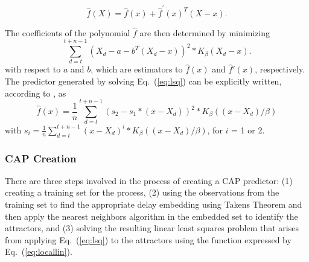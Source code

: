 \documentclass[prodmode,acmtaco,pdftex]{acmsmall}
\newcommand{\equationname}{Eq.}
\begin{document}
  \begin{equation}
    \label{eq:localtaylor}
    \hat{f}(X)=\hat{f}(x)+\hat{f}^{'}(x)^{T}(X-x).\nonumber
  \end{equation}

The coefficients of the polynomial $\hat{f}$ are then determined by minimizing
  \begin{equation}
    \label{eq:lsq}
    \displaystyle\sum_{d=t}^{t+n-1}\left(X_{d}-a-b^{T}(X_{d}-x)\right)^{2}*K_{\beta}(X_{d}-x).
  \end{equation}
 with respect to $a$ and $b$, which are estimators to
$\hat{f}(x)$ and $\hat{f}'(x)$, respectively.  The predictor generated
by solving \equationname~(\ref{eq:lsq}) can be explicitly written, according to
\cite{Box1994}, as
  \begin{equation}
    \label{eq:locallin}
    \hat{f}(x)=\frac{1}{n}\displaystyle\sum_{d=t}^{t+n-1}(s_{2}-s_{1}*(x-X_{d}))^{2}* K_{\beta}((x-X_{d})/\beta)
  \end{equation}
with $s_{i}=\frac{1}{n}\displaystyle\sum_{d=t}^{t+n-1}(x-X_{d})^{i}*K_{\beta}((x-X_{d})/\beta)$, for $i$ = 1 or 2.
\subsubsection{CAP Creation}
\label{sec:cappcreate}
There are three steps involved in the process of creating a CAP predictor:
(1) creating a training set for the process, (2) using the
observations from the training set to find the appropriate delay
embedding using Takens Theorem and then apply the nearest neighbors
algorithm in the embedded set to identify the attractors, and (3)
solving the resulting linear least squares problem that arises from
applying \equationname~(\ref{eq:lsq}) to the attractors using the
function expressed by \equationname~(\ref{eq:locallin}).
\end{document}
